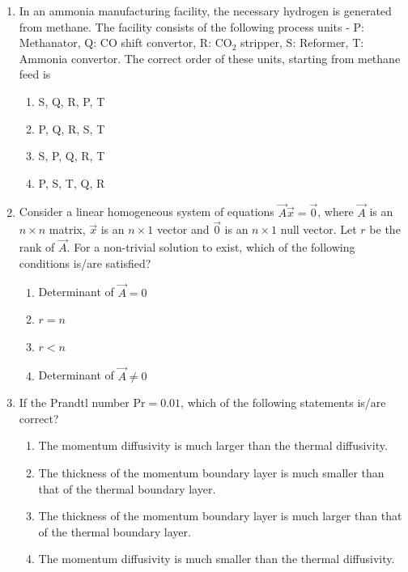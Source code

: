 \documentclass[journal,12pt,onecolumn]{IEEEtran}
\theoremstyle{remark}
\begin{document}
\begin{enumerate}
		\item In an ammonia manufacturing facility, the necessary hydrogen is generated from methane. The facility consists of the following process units - P: Methanator, Q: CO shift convertor, R: CO$_2$ stripper, S: Reformer, T: Ammonia convertor. The correct order of these units, starting from methane feed is
		
		\hfill{}
		\begin{enumerate}
			\item S, Q, R, P, T
			\item P, Q, R, S, T
			\item S, P, Q, R, T
			\item P, S, T, Q, R
		\end{enumerate}
		
		\item Consider a linear homogeneous system of equations $\vec{A}\vec{x} = \vec{0}$, where $\vec{A}$ is an $n \times n$ matrix, $\vec{x}$ is an $n \times 1$ vector and $\vec{0}$ is an $n \times 1$ null vector. Let $r$ be the rank of $\vec{A}$. For a non-trivial solution to exist, which of the following conditions is/are satisfied?
		
		\hfill{}
		\begin{enumerate}
			\item Determinant of $\vec{A} = 0$
			\item $r=n$
			\item $r < n$
			\item Determinant of $\vec{A} \ne 0$
		\end{enumerate}
		
		\item If the Prandtl number $\text{Pr} = 0.01$, which of the following statements is/are correct?
		
		\hfill{}
		\begin{enumerate}
			\item The momentum diffusivity is much larger than the thermal diffusivity.
			\item The thickness of the momentum boundary layer is much smaller than that of the thermal boundary layer.
			\item The thickness of the momentum boundary layer is much larger than that of the thermal boundary layer.
			\item The momentum diffusivity is much smaller than the thermal diffusivity.
		\end{enumerate}
		

\end{enumerate}
\end{document}
